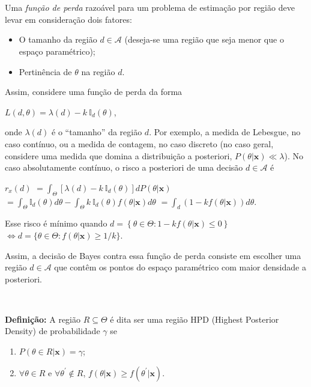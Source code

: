 \documentclass[
]{book}
\begin{document}
\(~\)

\(~\)

Uma \emph{função de perda} razoável para um problema de estimação por região deve levar em consideração dois fatores:

\begin{itemize}
\item
  O tamanho da região \(d \in \mathcal{A}\) (deseja-se uma região que seja menor que o espaço paramétrico);
\item
  Pertinência de \(\theta\) na região \(d\).
\end{itemize}

Assim, considere uma função de perda da forma

\(L(d,\theta)=\lambda(d)-k~\mathbb I_d(\theta)\),

onde \(\lambda(d)\) é o ``tamanho'' da região \(d\). Por exemplo, a medida de Lebesgue, no caso contínuo, ou a medida de contagem, no caso discreto (no caso geral, considere uma medida que domina a distribuição a posteriori, \(P(\theta|\boldsymbol x) \ll \lambda\)). No caso absolutamente contínuo, o risco a posteriori de uma decisão \(d \in \mathcal{A}\) é

\({r}_{x}(d)\) \(=\displaystyle\int_\Theta \left[\lambda(d)-k~\mathbb I_d(\theta)\right]dP(\theta|\boldsymbol x)\) \(=\displaystyle \int_\Theta\mathbb I_d(\theta)d\theta-\int_\Theta k~\mathbb I_d(\theta)f(\theta|\boldsymbol x)d\theta\) \(=\displaystyle \int_d\left(1-kf(\theta|\boldsymbol x)\right)d\theta\).

Esse risco é mínimo quando \(d=\left\{\theta\in\Theta:1-kf(\theta|\boldsymbol x)\leq 0\right\}\) \(\Leftrightarrow d=\{\theta\in\Theta:f(\theta|\boldsymbol x)\geq 1/k\}\).

Assim, a decisão de Bayes contra essa função de perda consiste em escolher uma região \(d \in \mathcal{A}\) que contêm os pontos do espaço paramétrico com maior densidade a posteriori.

\(~\)

\textbf{Definição:} A região \(R\subseteq \Theta\) é dita ser uma região HPD (Highest Posterior Density) de probabilidade \(\gamma\) se

\begin{enumerate}
\def\labelenumi{\roman{enumi}.}
\item
  \(P(\theta\in R|\boldsymbol x)=\gamma\);
\item
  \(\forall \theta \in R\) e \(\forall \theta^\prime\notin R\), \(f(\theta|\boldsymbol x)\geq f(\theta^\prime|\boldsymbol x)\).
\end{enumerate}
\end{document}
